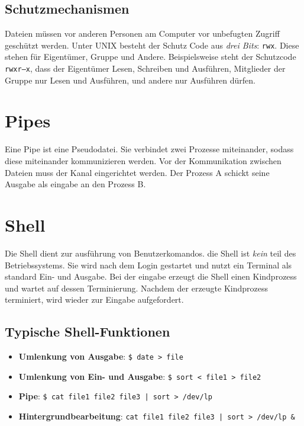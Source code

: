 \subsection{Schutzmechanismen}

Dateien müssen vor anderen Personen am Computer vor unbefugten Zugriff geschützt werden. Unter UNIX besteht der Schutz Code aus \textit{drei Bits}: \texttt{rwx}. Diese stehen für Eigentümer, Gruppe und Andere. Beispielsweise steht der Schutzcode \texttt{rwxr--x}, dass der Eigentümer Lesen, Schreiben und Ausführen, Mitglieder der Gruppe nur Lesen und Ausführen, und andere nur Ausführen dürfen.

\section{Pipes}

Eine Pipe ist eine Pseudodatei. Sie verbindet zwei Prozesse miteinander, sodass diese miteinander kommunizieren werden. Vor der Kommunikation zwischen Dateien muss der Kanal eingerichtet werden. Der Prozess A schickt seine Ausgabe als eingabe an den Prozess B.

\section{Shell}

Die Shell dient zur ausführung von Benutzerkomandos. die Shell ist \textit{kein} teil des Betriebssystems. Sie wird nach dem Login gestartet und nutzt ein Terminal als standard Ein- und Ausgabe. Bei der eingabe erzeugt die Shell einen Kindprozess und wartet auf dessen Terminierung. Nachdem der erzeugte Kindprozess terminiert, wird wieder zur Eingabe aufgefordert.

\subsection*{Typische Shell-Funktionen}

\begin{itemize}
    \item \textbf{Umlenkung von Ausgabe}: \texttt{\$ date > file}
    \item \textbf{Umlenkung von Ein- und Ausgabe}: \newline\texttt{\$ sort < file1 > file2}
    \item \textbf{Pipe}: \texttt{\$ cat file1 file2 file3 | sort > /dev/lp}
    \item \textbf{Hintergrundbearbeitung}: \newline\texttt{cat file1 file2 file3 | sort > /dev/lp \&}
\end{itemize}